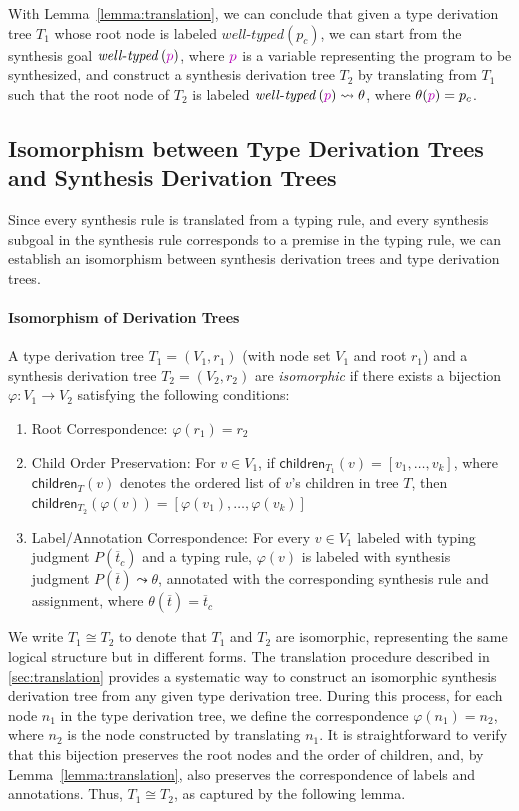 \documentclass[manuscript,screen]{acmart}
\newcommand{\sk}[1]{\textcolor{skunknown}{#1}}
\newcommand{\skhzc}[1]{#1}
\newcommand{\welltyped}[1]{\mathit{well\text{-}typed}\left(#1\right)}
\begin{document}
With Lemma~\ref{lemma:translation}, we can conclude that given a type derivation tree $T_1$ whose root node is labeled $\welltyped{p_c}$, we can start from the synthesis goal $\welltyped{\sk{p}}$, where $\sk{p}$ is a variable representing the program to be synthesized, and construct a synthesis derivation tree $T_2$ by translating from $T_1$ such that the root node of $T_2$ is labeled $\welltyped{\sk{p}} \leadsto \theta$, where $\theta(\sk{p}) = p_c$.

\subsection{Isomorphism between Type Derivation Trees and Synthesis Derivation Trees}
\label{sec:isomorphism}
Since every synthesis rule is translated from a typing rule, and every synthesis subgoal in the synthesis rule corresponds to a premise in the typing rule, we can establish an isomorphism between synthesis derivation trees and type derivation trees.

\paragraph{Isomorphism of Derivation Trees}
A type derivation tree $T_1 = (V_1, r_1)$ (with node set $V_1$ and root $r_1$) and a synthesis derivation tree $T_2 = (V_2, r_2)$ are \emph{isomorphic} if there exists a bijection $\varphi: V_1 \to V_2$ satisfying the following conditions:
\begin{enumerate}
    \item Root Correspondence: $\varphi(r_1) = r_2$
    \item Child Order Preservation: For $v \in V_1$, if $\mathsf{children}_{T_1}(v) = [v_1, \ldots, v_k]$, where $\mathsf{children}_{T}(v)$ denotes the ordered list of $v$'s children in tree $T$, then $\mathsf{children}_{T_2}(\varphi(v)) = [\varphi(v_1), \ldots, \varphi(v_k)]$
    \item Label/Annotation Correspondence: For every $v \in V_1$ labeled with typing judgment $P(\overline{t}_c)$ and a typing rule, $\varphi(v)$ is labeled with synthesis judgment $P(\skhzc{\overline{t}}) \leadsto \theta$, annotated with the corresponding synthesis rule and assignment, where $\theta(\skhzc{\overline{t}}) = \overline{t}_c$
\end{enumerate}
We write $T_1 \cong T_2$ to denote that $T_1$ and $T_2$ are isomorphic, representing the same logical structure but in different forms.
%
The translation procedure described in \autoref{sec:translation} provides a systematic way to construct an isomorphic synthesis derivation tree from any given type derivation tree. During this process, for each node $n_1$ in the type derivation tree, we define the correspondence $\varphi(n_1) = n_2$, where $n_2$ is the node constructed by translating $n_1$. It is straightforward to verify that this bijection preserves the root nodes and the order of children, and, by Lemma~\ref{lemma:translation}, also preserves the correspondence of labels and annotations. Thus, $T_1 \cong T_2$, as captured by the following lemma.
\end{document}
